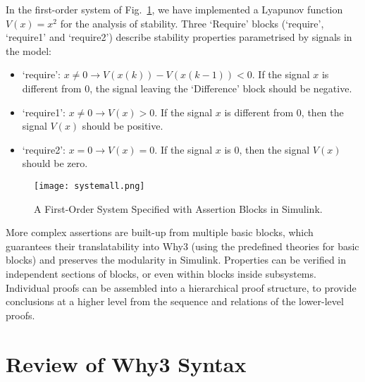 \documentclass[a4paper]{article}
\begin{document}
In the first-order system of Fig.~\ref{systemcomplex}, we have implemented a Lyapunov function $V(x)=x^2$ for the analysis of stability. Three `Require'  blocks (`require', `require1' and `require2') describe stability properties parametrised by signals in the model: 
\begin{itemize}
\item `require': $x\neq 0 \rightarrow V(x(k))-V(x(k-1))<0$. If the signal $x$ is different from 0, the signal leaving the `Difference' block should be negative.
\item `require1': $x\neq 0 \rightarrow V(x)>0$. If the signal $x$ is different from 0, then the signal $V(x)$ should be positive. 
\item `require2': $x=0 \rightarrow V(x)=0$. If the signal $x$ is 0, then the signal $V(x)$ should be zero.   
\end{itemize}

\begin{figure}[!t]
\centering
\texttt{[image: systemall.png]}
\caption{A First-Order System Specified with Assertion Blocks in Simulink.}
\label{systemcomplex}
\end{figure}

More complex assertions are built-up from multiple basic blocks, which guarantees their translatability into Why3 (using the predefined theories for basic blocks) and preserves the modularity in Simulink. Properties can be verified in independent sections of blocks, or even within blocks inside subsystems. Individual proofs  can be assembled into a hierarchical proof structure, to provide conclusions at a higher level from the sequence and relations of the lower-level proofs.


\section{Review of Why3 Syntax} \label{Why3syntax}
\end{document}
